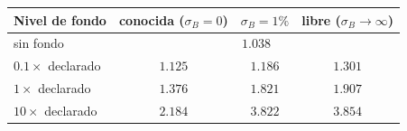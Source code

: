 \begin{tabular}{@{}lccc@{}}
\toprule
Nivel de fondo & conocida ($\sigma_B{=}0$) & $\sigma_B{=}1\%$ & libre ($\sigma_B\to\infty$) \\
\midrule
sin fondo & \multicolumn{3}{c}{$1.038$} \\
$0.1\times$ declarado & $1.125$ & $1.186$ & $1.301$ \\
$1\times$ declarado & $1.376$ & $1.821$ & $1.907$ \\
$10\times$ declarado & $2.184$ & $3.822$ & $3.854$ \\
\bottomrule
\end{tabular}
